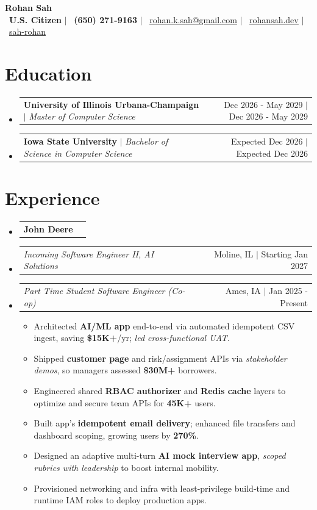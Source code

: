 \documentclass[11pt]{article}
\makeatletter
\newcommand{\resumeItem}[1]{
  \item\small{{#1\vspace{0pt}}}
}
\newcommand{\resumeSubheading}[4]{
  \item
    \begin{tabular*}{0.97\textwidth}[t]{l@{\extracolsep{\fill}}r}
      {\textbf{#1} $|$  #3} & \ifx\relax#4\relax #2\else #4 $|$ #2\fi \\
    \end{tabular*}\vspace{-6pt}
}
\newcommand{\resumeCompany}[2]{
  \item
    \begin{tabular*}{0.97\textwidth}[t]{l@{\extracolsep{\fill}}r}
      \textbf{#1} & #2 \\
    \end{tabular*}\vspace{-8pt}
}
\newcommand{\resumeRole}[2]{
  \item
    \begin{tabular*}{0.97\textwidth}[t]{l@{\extracolsep{\fill}}r}
      {\emph{#1}} & #2 \\
    \end{tabular*}\vspace{-6pt}
}
\newcommand{\resumeSubHeadingListStart}{\begin{itemize}[leftmargin=-0in, label={}]}
\newcommand{\resumeSubHeadingListEnd}{\end{itemize}}
\newcommand{\resumeItemListStart}{\begin{itemize}[itemsep=4pt, parsep=0pt, topsep=6pt]}
\newcommand{\resumeItemListEnd}{\end{itemize}\vspace{-5pt}}
\makeatother
\begin{document}
\begin{center}
    \textbf{\Huge Rohan Sah} \\
    \vspace{6pt}
    \footnotesize
    \faFlagUsa\ \textbf{U.S. Citizen} $|$
    \faPhone\ \textbf{(650) 271-9163} $|$
    \faEnvelope\ \href{mailto:rohan.k.sah@gmail.com}{\underline{\color{blue}rohan.k.sah@gmail.com}} $|$
    \faGlobe\ \href{https://rohansah.dev}{\underline{\color{blue}rohansah.dev}} $|$
    \faGithub\ \href{https://github.com/sah-rohan}{\underline{\color{blue}sah-rohan}}
\end{center}
\section{Education}
  \resumeSubHeadingListStart
    \resumeSubheading
      {University of Illinois Urbana-Champaign}{Dec 2026 - May 2029}
      {\emph{Master of Computer Science}}{}
\vspace{2pt}
    \resumeSubheading
      {Iowa State University}{Expected Dec 2026}
      {\emph{Bachelor of Science in Computer Science}}{}
\vspace{2pt}
  \resumeSubHeadingListEnd
\section{Experience}
\resumeSubHeadingListStart
  \resumeCompany{John Deere}{}
  \resumeRole{Incoming Software Engineer II, AI Solutions}{Moline, IL $|$ Starting Jan 2027}
  \resumeRole{Part Time Student Software Engineer (Co-op)}{Ames, IA $|$ Jan 2025 - Present}
    \resumeItemListStart
        \resumeItem{Architected \textbf{AI/ML app} end-to-end via automated idempotent CSV ingest, saving \textbf{\$15K+}/yr; \emph{led cross-functional UAT}.}
       \resumeItem{Shipped \textbf{customer page} and risk/assignment APIs via \emph{stakeholder demos}, so managers assessed \textbf{\$30M+} borrowers.}
         \resumeItem{Engineered shared \textbf{RBAC authorizer} and \textbf{Redis cache} layers to optimize and secure team APIs for \textbf{45K+} users.}
      \resumeItem{Built app's \textbf{idempotent email delivery}; enhanced file transfers and dashboard scoping, growing users by \textbf{270\%}.}
      \resumeItem{Designed an adaptive multi-turn \textbf{AI mock interview app}, \emph{scoped rubrics with leadership} to boost internal mobility.}
       \resumeItem{Provisioned networking and infra with least-privilege build-time and runtime IAM roles to deploy production apps.}
    \resumeItemListEnd
\vspace{0pt}
\resumeSubHeadingListEnd
\end{document}
